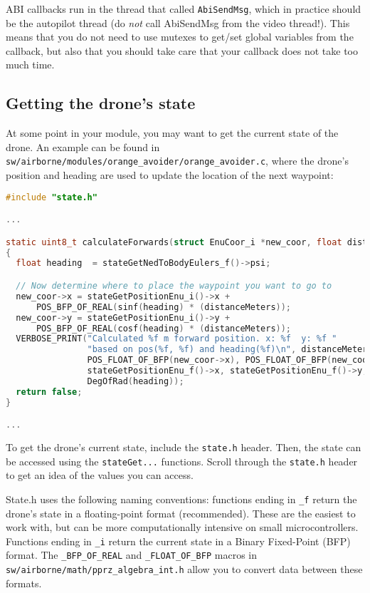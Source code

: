 \documentclass{article}
\begin{document}
ABI callbacks run in the thread that called \texttt{AbiSendMsg}, which in practice should be the autopilot thread (do \emph{not} call AbiSendMsg from the video thread!). This means that you do not need to use mutexes to get/set global variables from the callback, but also that you should take care that your callback does not take too much time.




\subsection{Getting the drone's state}
At some point in your module, you may want to get the current state of the drone.
An example can be found in \texttt{sw/airborne/modules/orange\_avoider/orange\_avoider.c}, where the drone's position and heading are used to update the location of the next waypoint:
\begin{lstlisting}[language=c]
#include "state.h"

...

static uint8_t calculateForwards(struct EnuCoor_i *new_coor, float distanceMeters)
{
  float heading  = stateGetNedToBodyEulers_f()->psi;

  // Now determine where to place the waypoint you want to go to
  new_coor->x = stateGetPositionEnu_i()->x + 
      POS_BFP_OF_REAL(sinf(heading) * (distanceMeters));
  new_coor->y = stateGetPositionEnu_i()->y +
      POS_BFP_OF_REAL(cosf(heading) * (distanceMeters));
  VERBOSE_PRINT("Calculated %f m forward position. x: %f  y: %f "
                "based on pos(%f, %f) and heading(%f)\n", distanceMeters,	
                POS_FLOAT_OF_BFP(new_coor->x), POS_FLOAT_OF_BFP(new_coor->y),
                stateGetPositionEnu_f()->x, stateGetPositionEnu_f()->y,
                DegOfRad(heading));
  return false;
}

...
\end{lstlisting}
To get the drone's current state, include the \texttt{state.h} header. Then, the state can be accessed using the \texttt{stateGet...} functions. Scroll through the \texttt{state.h} header to get an idea of the values you can access.

State.h uses the following naming conventions: functions ending in \texttt{\_f} return the drone's state in a floating-point format (recommended). These are the easiest to work with, but can be more computationally intensive on small microcontrollers. Functions ending in \texttt{\_i} return the current state in a Binary Fixed-Point (BFP) format. The \texttt{\_BFP\_OF\_REAL} and \texttt{\_FLOAT\_OF\_BFP} macros in \texttt{sw/airborne/math/pprz\_algebra\_int.h} allow you to convert data between these formats.
\end{document}
